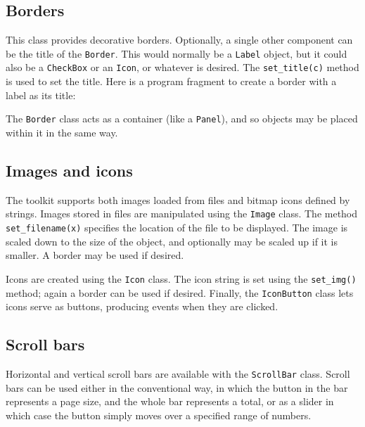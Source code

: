 \subsection{Borders}

This class provides decorative borders. Optionally, a single other
component can be the title of the \texttt{Border}. This would normally
be a \texttt{Label} object, but it could also be a \texttt{CheckBox} or
an \texttt{Icon}, or whatever is desired. The \texttt{set\_title(c)}
method is used to set the title. Here is a program fragment to create a
border with a label as its title:


The \texttt{Border} class acts as a container (like a \texttt{Panel}),
and so objects may be placed within it in the same way.

\subsection{Images and icons}

The toolkit supports both images loaded from files and
bitmap icons defined by strings. Images stored in files are manipulated
using the \texttt{Image} class. The method \texttt{set\_filename(x)}
specifies the location of the file to be displayed. The image is scaled down
to the size of the object, and optionally may be scaled up if it is
smaller. A border may be used if desired.

Icons are created using the \texttt{Icon} class. The icon string is set
using the \texttt{set\_img()} method; again a border can be used if
desired. Finally, the \texttt{IconButton} class lets icons serve as
buttons, producing events when they are clicked.

\subsection{Scroll bars}

Horizontal and vertical scroll bars are available with the
\texttt{ScrollBar} class. Scroll bars can be used either in the
conventional way, in which the button in the bar represents a page
size, and the whole bar represents a total, or as a slider in which
case the button simply moves over a specified range of numbers.

